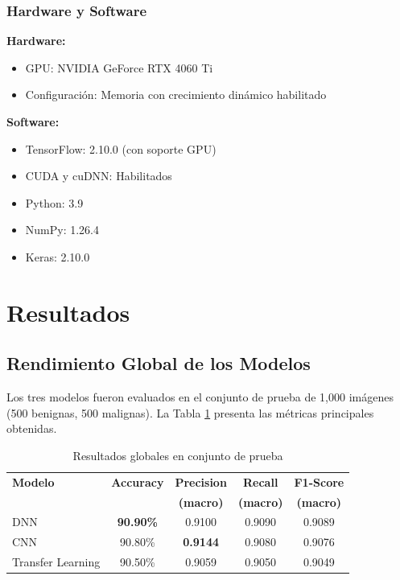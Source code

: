 \documentclass[11pt, a4paper]{article}
\begin{document}
\subsubsection{Hardware y Software}

\textbf{Hardware:}
\begin{itemize}
    \item GPU: NVIDIA GeForce RTX 4060 Ti
    \item Configuración: Memoria con crecimiento dinámico habilitado
\end{itemize}

\textbf{Software:}
\begin{itemize}
    \item TensorFlow: 2.10.0 (con soporte GPU)
    \item CUDA y cuDNN: Habilitados
    \item Python: 3.9
    \item NumPy: 1.26.4
    \item Keras: 2.10.0
\end{itemize}

\section{Resultados}

\subsection{Rendimiento Global de los Modelos}

Los tres modelos fueron evaluados en el conjunto de prueba de 1,000 imágenes (500 benignas, 500 malignas). La Tabla \ref{tab:resultados_globales} presenta las métricas principales obtenidas.

\begin{table}[H]
\centering
\caption{Resultados globales en conjunto de prueba}
\label{tab:resultados_globales}
\begin{tabular}{@{}lcccc@{}}
\toprule
\textbf{Modelo} & \textbf{Accuracy} & \textbf{Precision} & \textbf{Recall} & \textbf{F1-Score} \\
 & & \textbf{(macro)} & \textbf{(macro)} & \textbf{(macro)} \\
\midrule
DNN                     & \textbf{90.90\%} & 0.9100 & 0.9090 & 0.9089 \\
CNN                     & 90.80\%           & \textbf{0.9144} & 0.9080 & 0.9076 \\
Transfer Learning       & 90.50\%           & 0.9059 & 0.9050 & 0.9049 \\
\bottomrule
\end{tabular}
\end{table}
\end{document}
